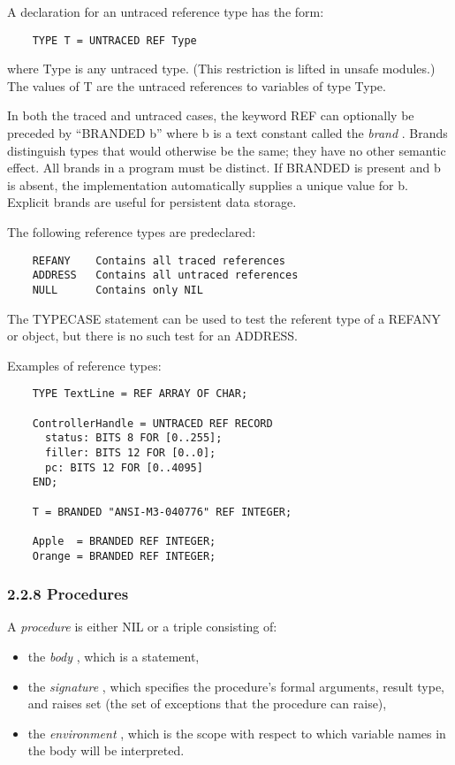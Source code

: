 \documentclass[10pt]{article}
\begin{document}
A declaration for an untraced reference type has the form:
\begin{verbatim}
    TYPE T = UNTRACED REF Type
\end{verbatim}
where Type is any untraced type. (This restriction is lifted in unsafe
modules.) The values of T are the untraced references to variables of type
Type.

In both the traced and untraced cases, the keyword REF can optionally be
preceded by ``BRANDED b'' where b is a text constant called the \emph{brand}
. Brands distinguish types that would otherwise be the same; they have no
other semantic effect. All brands in a program must be distinct. If BRANDED is
present and b is absent, the implementation automatically supplies a unique
value for b. Explicit brands are useful for persistent data storage.

The following reference types are predeclared:
\begin{verbatim}
    REFANY    Contains all traced references
    ADDRESS   Contains all untraced references
    NULL      Contains only NIL
\end{verbatim}
The TYPECASE statement can be used to test the referent type of a REFANY or
object, but there is no such test for an ADDRESS.

Examples of reference types:
\begin{verbatim}
    TYPE TextLine = REF ARRAY OF CHAR;

    ControllerHandle = UNTRACED REF RECORD
      status: BITS 8 FOR [0..255];
      filler: BITS 12 FOR [0..0];
      pc: BITS 12 FOR [0..4095]
    END;

    T = BRANDED "ANSI-M3-040776" REF INTEGER;

    Apple  = BRANDED REF INTEGER;
    Orange = BRANDED REF INTEGER;
\end{verbatim}

\subsubsection*{2.2.8 Procedures}

A \emph{procedure} is either NIL or a triple consisting of:
\begin{itemize}
\item the \emph{body} , which is a statement,
\item the \emph{signature} , which specifies the procedure's formal arguments,
  result type, and raises set (the set of exceptions that the procedure can
  raise),
\item the \emph{environment} , which is the scope with respect to which
  variable names in the body will be interpreted.
\end{itemize}
\end{document}
